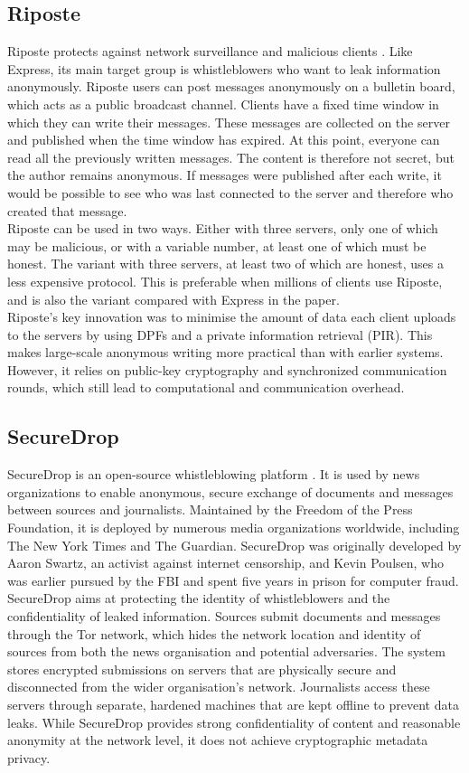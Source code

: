 \documentclass[a4paper]{article}
\begin{document}
\subsection{Riposte}
Riposte protects against network surveillance and malicious clients \citep{Corrigan_Gibbs_2015}. Like Express, its main target group is whistleblowers who want to leak information anonymously. Riposte users can post messages anonymously on a bulletin board, which acts as a public broadcast channel. Clients have a fixed time window in which they can write their messages. These messages are collected on the server and published when the time window has expired. At this point, everyone can read all the previously written messages. The content is therefore not secret, but the author remains anonymous. If messages were published after each write, it would be possible to see who was last connected to the server and therefore who created that message.\\
Riposte can be used in two ways. Either with three servers, only one of which may be malicious, or with a variable number, at least one of which must be honest. The variant with three servers, at least two of which are honest, uses a less expensive protocol. This is preferable when millions of clients use Riposte, and is also the variant compared with Express in the paper. \\
Riposte's key innovation was to minimise the amount of data each client uploads to the servers by using DPFs and a private information retrieval (PIR). This makes large-scale anonymous writing more practical than with earlier systems. However, it relies on public-key cryptography and synchronized communication rounds, which still lead to computational and communication overhead.


\subsection{SecureDrop}
SecureDrop \citep{securedrop} is an open-source whistleblowing platform \citep{berret2016guide}. It is used by news organizations to enable anonymous, secure exchange of documents and messages between sources and journalists. Maintained by the Freedom of the Press Foundation, it is deployed by numerous media organizations worldwide, including The New York Times and The Guardian. SecureDrop was originally developed by Aaron Swartz, an activist against internet censorship, and Kevin Poulsen, who was earlier pursued by the FBI and spent five years in prison for computer fraud. SecureDrop aims at protecting the identity of whistleblowers and the confidentiality of leaked information. Sources submit documents and messages through the Tor network, which hides the network location and identity of sources from both the news organisation and potential adversaries. The system stores encrypted submissions on servers that are physically secure and disconnected from the wider organisation's network. Journalists access these servers through separate, hardened machines that are kept offline to prevent data leaks.
While SecureDrop provides strong confidentiality of content and reasonable anonymity at the network level, it does not achieve cryptographic metadata privacy. 
\end{document}
